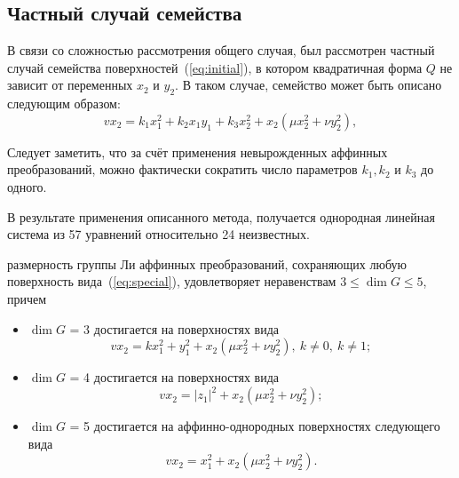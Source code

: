 \documentclass[../main.tex]{subfiles}
\begin{document}
\subsection{Частный случай семейства}
В связи со сложностью рассмотрения общего случая, был рассмотрен частный случай семейства поверхностей~(\ref{eq:initial}), в котором квадратичная форма $Q$ не зависит от переменных $x_2$ и $y_2$. В таком случае, семейство может быть описано следующим образом:
\begin{equation}\label{eq:special}
v x_2 = k_1 x_1^2 + k_2 x_1 y_1 + k_3 x_2^2 + x_2 (\mu x_2^2 + \nu y_2^2),
\end{equation}

Следует заметить, что за счёт применения невырожденных аффинных преобразований, можно фактически сократить число параметров $k_1, k_2$ и $k_3$ до одного.

В результате применения описанного метода, получается однородная линейная система из 57 уравнений относительно 24 неизвестных.

\begin{theorem} размерность группы Ли аффинных преобразований, сохраняющих любую поверхность вида~(\ref{eq:special}), удовлетворяет неравенствам
$3 \le \dim G \le 5$, причем
\begin{itemize}
	\item $\dim G$ = 3 достигается на поверхностях вида
	\begin{equation}\label{eq:special_3}
		v x_2 = k x_1^2 + y_1^2 + x_2 (\mu x_2^2 + \nu y_2^2),\ k \ne 0, \ k \ne 1;
	\end{equation}
	\item $\dim G$ = 4 достигается на поверхностях вида
	\begin{equation}\label{eq:special_4}
		v x_2 = |z_1|^2 + x_2 (\mu x_2^2 + \nu y_2^2);
	\end{equation}
		\item $\dim G$ = 5 достигается на аффинно-однородных поверхностях следующего вида
	\begin{equation}\label{eq:special_5}
		v x_2 = x_1^2 + x_2 (\mu x_2^2 + \nu y_2^2).
	\end{equation}
\end{itemize}
\end{theorem}
\end{document}
